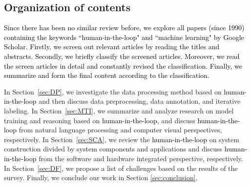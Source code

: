\documentclass{article}
\newcommand{\REO}[1]{\textcolor{black}{#1}}
\begin{document}
\subsection{Organization of contents}


\REO{Since there has been no similar review before, we explore all papers (since 1990) containing the keywords ``human-in-the-loop" and ``machine learning" by Google Scholar.
Firstly, we screen out relevant articles by reading the titles and abstracts. Secondly, we briefly classify the screened articles. Moreover, we read the screen articles in detail and constantly revised the classification. Finally, we summarize and form the final content according to the classification.}


In Section~\ref{sec:DP}, we investigate the data processing method based on \REO{human-in-the-loop} and then discuss data preprocessing, data annotation, and iterative labeling.
In Section~\ref{sec:MTI}, we summarize and analyze research on model training and reasoning based on \REO{human-in-the-loop}, and discuss \REO{human-in-the-loop} from natural language processing and computer visual perspectives, respectively.
In Section~\ref{sec:SCA}, we review the \REO{human-in-the-loop} on system construction divided by system components and applications and discuss \REO{human-in-the-loop} from the software and hardware integrated perspective, respectively.
In Section~\ref{sec:DF}, we propose a list of challenges based on the results of the survey.
Finally, we conclude our work in Section \ref{sec:conclusion}.
\end{document}
